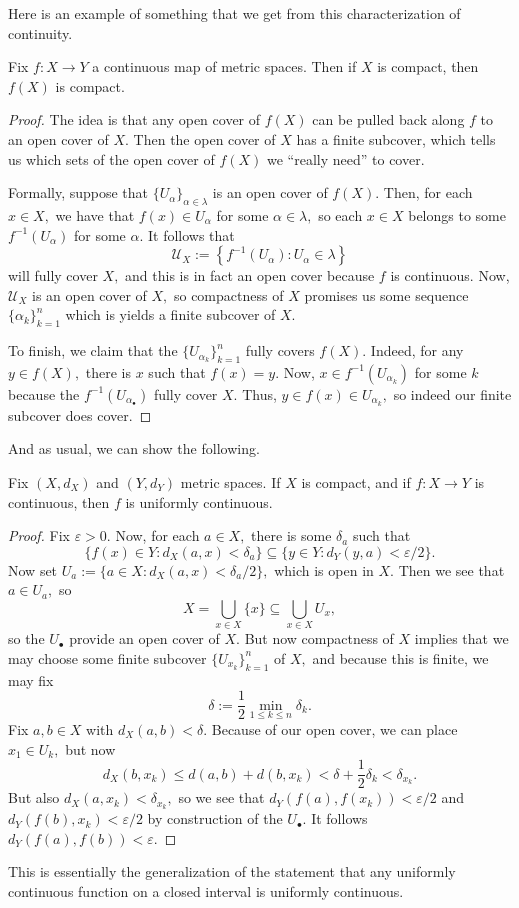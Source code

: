Here is an example of something that we get from this characterization of continuity.
\begin{proposition}
	Fix $f:X\to Y$ a continuous map of metric spaces. Then if $X$ is compact, then $f(X)$ is compact.
\end{proposition}
\begin{proof}
	The idea is that any open cover of $f(X)$ can be pulled back along $f$ to an open cover of $X.$ Then the open cover of $X$ has a finite subcover, which tells us which sets of the open cover of $f(X)$ we ``really need'' to cover.

	Formally, suppose that $\{U_\alpha\}_{\alpha\in\lambda}$ is an open cover of $f(X).$ Then, for each $x\in X,$ we have that $f(x)\in U_\alpha$ for some $\alpha\in\lambda,$ so each $x\in X$ belongs to some $f^{-1}(U_\alpha)$ for some $\alpha.$ It follows that
	\[\mathcal U_X:=\left\{f^{-1}(U_\alpha):U_\alpha\in\lambda\right\}\]
	will fully cover $X,$ and this is in fact an open cover because $f$ is continuous. Now, $\mathcal U_X$ is an open cover of $X,$ so compactness of $X$ promises us some sequence $\{\alpha_k\}_{k=1}^n$ which is yields a finite subcover of $X.$

	To finish, we claim that the $\{U_{\alpha_k}\}_{k=1}^n$ fully covers $f(X).$ Indeed, for any $y\in f(X),$ there is $x$ such that $f(x)=y.$ Now, $x\in f^{-1}(U_{\alpha_k})$ for some $k$ because the $f^{-1}(U_{\alpha_\bullet})$ fully cover $X.$ Thus, $y\in f(x)\in U_{\alpha_k},$ so indeed our finite subcover does cover.
\end{proof}
And as usual, we can show the following.
\begin{proposition}
	Fix $(X,d_X)$ and $(Y,d_Y)$ metric spaces. If $X$ is compact, and if $f:X\to Y$ is continuous, then $f$ is uniformly continuous.
\end{proposition}
\begin{proof}
	Fix $\varepsilon>0.$ Now, for each $a\in X,$ there is some $\delta_a$ such that
	\[\{f(x)\in Y:d_X(a,x)<\delta_a\}\subseteq\{y\in Y:d_Y(y,a)<\varepsilon/2\}.\]
	Now set $U_a:=\{a\in X:d_X(a,x)<\delta_a/2\},$ which is open in $X.$ Then we see that $a\in U_a,$ so
	\[X=\bigcup_{x\in X}\{x\}\subseteq\bigcup_{x\in X}U_x,\]
	so the $U_\bullet$ provide an open cover of $X.$ But now compactness of $X$ implies that we may choose some finite subcover $\{U_{x_k}\}_{k=1}^n$ of $X,$ and because this is finite, we may fix
	\[\delta:=\frac12\min_{1\le k\le n}\delta_k.\]
	Fix $a,b\in X$ with $d_X(a,b)<\delta.$ Because of our open cover, we can place $x_1\in U_k,$ but now
	\[d_X(b,x_k)\le d(a,b)+d(b,x_k)<\delta+\frac12\delta_k<\delta_{x_k}.\]
	But also $d_X(a,x_k)<\delta_{x_k},$ so we see that $d_Y(f(a),f(x_k))<\varepsilon/2$ and $d_Y(f(b),x_k)<\varepsilon/2$ by construction of the $U_\bullet.$ It follows $d_Y(f(a),f(b))<\varepsilon.$
\end{proof}
\begin{remark}
	This is essentially the generalization of the statement that any uniformly continuous function on a closed interval is uniformly continuous.
\end{remark}

